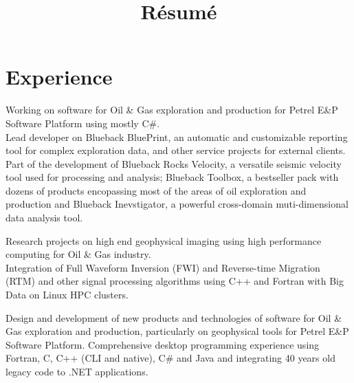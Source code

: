 \documentclass[11pt, a4paper, sans]{moderncv} %
\title{R\'esum\'e}
\begin{document}
\makecvtitle %




\section{Experience}

{
Working on software for Oil \& Gas exploration and production for Petrel E\&P Software Platform using mostly C\#.\\ 
Lead developer on  Blueback BluePrint, an automatic and customizable reporting tool for complex exploration data, and other service projects for external clients.\\
Part of the development of Blueback Rocks Velocity, a versatile seismic velocity tool used for processing and analysis;  Blueback Toolbox, a bestseller pack with dozens of products encopassing most of the areas of oil exploration and production and Blueback Inevstigator, a powerful cross-domain muti-dimensional data analysis tool.
}


{
Research projects on high end geophysical imaging using high performance computing for Oil \& Gas industry.\\
Integration of Full Waveform Inversion (FWI) and Reverse-time Migration (RTM) and other signal processing algorithms using C++ and Fortran with Big Data on Linux HPC clusters.
}




{
Design and development of new products and technologies of software for Oil \& Gas exploration and production, particularly on geophysical tools for Petrel E\&P Software Platform. 
Comprehensive desktop programming experience using Fortran, C, C++ (CLI and native), C\# and Java and integrating 40 years old legacy code to .NET applications.
}
\end{document}
